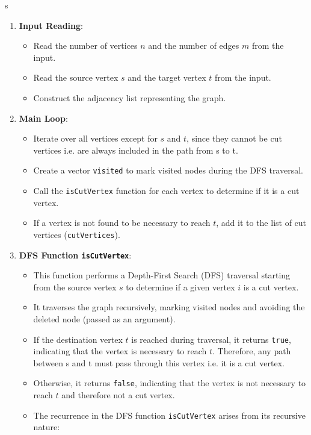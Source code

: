 s\documentclass{article}
\begin{document}
\begin{enumerate}
    \item \textbf{Input Reading}:
    \begin{itemize}
        \item Read the number of vertices $n$ and the number of edges $m$ from the input.
        \item Read the source vertex $s$ and the target vertex $t$ from the input.
        \item Construct the adjacency list representing the graph.
    \end{itemize}

    \item \textbf{Main Loop}:
    \begin{itemize}
        \item Iterate over all vertices except for $s$ and $t$, since they cannot be cut vertices i.e. are always included in the path from s to t.
        \item Create a vector \texttt{visited} to mark visited nodes during the DFS traversal.
        \item Call the \texttt{isCutVertex} function for each vertex to determine if it is a cut vertex.
        \item If a vertex is not found to be necessary to reach $t$, add it to the list of cut vertices (\texttt{cutVertices}).
    \end{itemize}
    
    \item \textbf{DFS Function \texttt{isCutVertex}}:
    \begin{itemize}
        \item This function performs a Depth-First Search (DFS) traversal starting from the source vertex $s$ to determine if a given vertex $i$ is a cut vertex.
        \item It traverses the graph recursively, marking visited nodes and avoiding the deleted node (passed as an argument).
        \item If the destination vertex $t$ is reached during traversal, it returns \texttt{true}, indicating that the vertex is necessary to reach $t$. Therefore, any path between s and t must pass through this vertex i.e. it is a cut vertex.
        \item Otherwise, it returns \texttt{false}, indicating that the vertex is not necessary to reach $t$ and therefore not a cut vertex.
        \item The recurrence in the DFS function \texttt{isCutVertex} arises from its recursive nature:
        

\end{itemize}
\end{enumerate}
\end{document}
